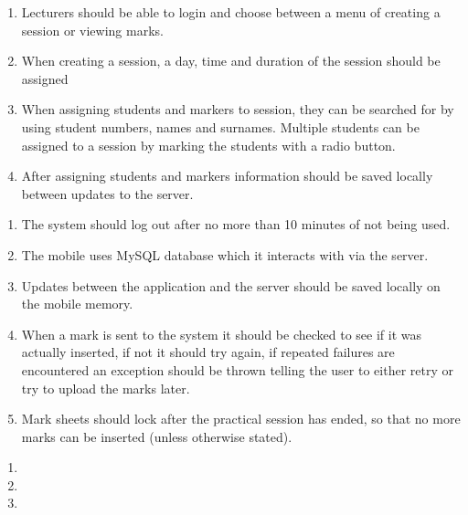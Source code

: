 \documentclass{article}
\begin{document}
\begin{enumerate}
\item  Lecturers should be able to login and choose between a menu of creating a session or viewing marks.

\item  When creating a session, a day, time and duration of the session should be assigned

\item  When assigning students and markers to session, they can be searched for by using student numbers, names and surnames. Multiple students can be assigned to a session by marking the students with a radio button.

\item  After assigning students and markers information should be saved locally between updates to the server.
\end{enumerate}

\noindent 

\noindent 

\begin{enumerate}
\item  The system should log out after no more than 10 minutes of not being used. 

\item  The mobile uses MySQL database which it interacts with via the server. 

\item  Updates between the application and the server should be saved locally on the mobile memory.

\item  When a mark is sent to the system it should be checked to see if it was actually inserted, if not it should try again, if repeated failures are encountered an exception should be thrown telling the user to either retry or try to upload the marks later. 

\item  Mark sheets should lock after the practical session has ended, so that no more marks can be inserted (unless otherwise stated). 
\end{enumerate}

\noindent 

\begin{enumerate}
\item  

\item  

\item  
\end{enumerate}
\end{document}
